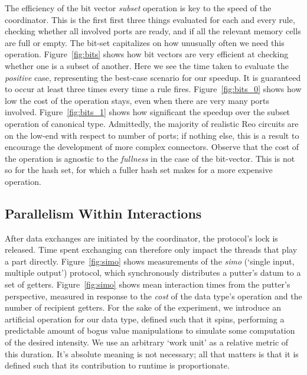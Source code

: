 The efficiency of the bit vector \textit{subset} operation is key to the speed of the coordinator. This is the first first three things evaluated for each and every rule, checking whether all involved ports are ready, and if all the relevant memory cells are full or empty. The bit-set capitalizes on how unusually often we need this operation. Figure~\ref{fig:bits} shows how bit vectors are very efficient at checking whether one is a subset of another. Here we see the time taken to evaluate the \textit{positive} case, representing the best-case scenario for our speedup. It is guaranteed to occur at least three times every time a rule fires. Figure~\ref{fig:bits_0} shows how low the cost of the operation stays, even when there are very many ports involved. Figure~\ref{fig:bits_1} shows how significant the speedup over the subset operation of canonical  type. Admittedly, the majority of realistic Reo circuits are on the low-end with respect to number of ports; if nothing else, this is a result to encourage the development of more complex connectors. Observe that the cost of the operation is agnostic to the \textit{fullness} in the case of the bit-vector. This is not so for the hash set, for which a fuller hash set makes for a more expensive operation. 



\subsection{Parallelism Within Interactions}
After data exchanges are initiated by the coordinator, the protocol's lock is released. Time spent exchanging can therefore only impact the threads that play a part directly. Figure~\ref{fig:simo} shows measurements of the \textit{simo} (`single input, multiple output') protocol, which synchronously distributes a putter's datum to a set of getters. Figure~\ref{fig:simo} shows mean interaction times from the putter's perspective, measured in response to the \textit{cost} of the data type's  operation and the number of recipient getters. For the sake of the experiment, we introduce an artificial  operation for our data type, defined such that it spins, performing a predictable amount of bogus value manipulations to simulate some computation of the desired intensity. We use an arbitrary `work unit' as a relative metric of this duration. It's absolute meaning is not necessary; all that matters is that it is defined such that its contribution to runtime is proportionate.

